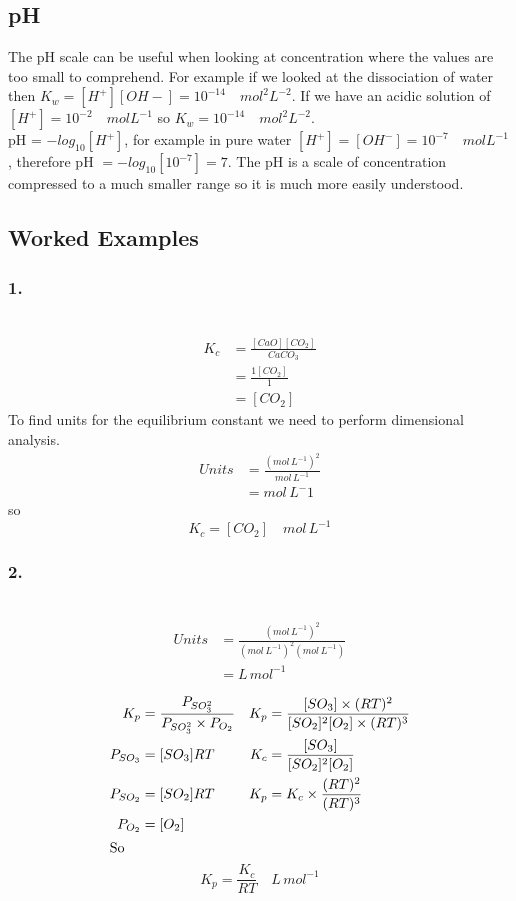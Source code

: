 \documentclass[a4paper, 12pt]{article}
\begin{document}
	\subsection{pH}
		The pH scale can be useful when looking at concentration where the values are too small to comprehend. For example if we looked at the dissociation of water  then $K_w = [H^+][OH-] = 10^{-14} \quad mol^2  L^{-2}$. If we have an acidic solution of $[H^+] = 10^{-2} \quad mol  L^{-1}$ so $K_w = 10^{-14} \quad mol^2  L^{-2}$. \\
		pH = $-log_{10}[H^+]$, for example in pure water $[H^+] = [OH^-] = 10^{-7} \quad mol L^{-1}$, therefore pH $= -log_{10}[10^{-7}]=7$. The pH is a scale of concentration compressed to a much smaller range so it is much more easily understood. 
		
	\subsection{Worked Examples}
		\subsubsection*{1.}
			 \\
			\begin{align*}
				K_c &= \frac{[CaO][CO_2]}{CaCO_3} \\
				&= \frac{1[CO_2]}{1} \\
				&=[CO_2]
			\end{align*}
			To find units for the equilibrium constant we need to perform dimensional analysis. \\
			\begin{align*}
				Units &= \frac{(mol\,L^{-1})^2}{mol\,L^{-1}} \\
				&= mol\,L^-1
			\end{align*}
			so
			\[ K_c = [CO_2] \quad mol\,L^{-1} \]
			
		\subsubsection{2.}
			 \\
			\begin{align*}
				Units &= \frac{(mol\,L^{-1})^2}{(mol\,L^{-1})^2(mol\,L^{-1})} \\
				&= L\,mol^{-1}
			\end{align*}
			
			\begin{align*}
				K_p &= \frac{P_{SO_3^2}}{P_{SO_3^2} \times P_{O_2}} & K_p &= \frac{[SO_3] \times (RT)^2}{[SO_2]^2[O_2] \times (RT)^3} \\
				P_{SO_3} &= [SO_3]RT & K_c &= \frac{[SO_3]}{[SO_2]^2[O_2]}\\
				P_{SO_2} &= [SO_2]RT & K_p &= K_c \times \frac{(RT)^2}{(RT)^3} \\
				 P_{O_2} &= [O_2] \\
				 \intertext{So}
			\end{align*}
				\[ K_p = \frac{K_c}{RT} \quad L \, mol^{-1} \]
\end{document}
